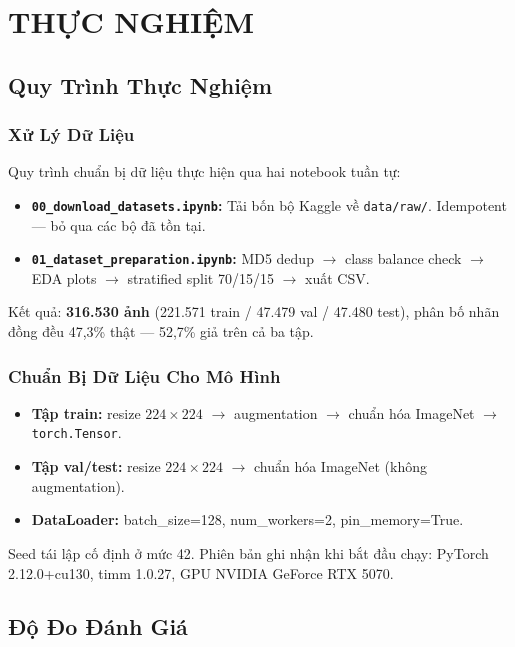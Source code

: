 \chapter{THỰC NGHIỆM}

\section{Quy Trình Thực Nghiệm}

\subsection{Xử Lý Dữ Liệu}

Quy trình chuẩn bị dữ liệu thực hiện qua hai notebook tuần tự:
\begin{itemize}
  \item \textbf{\texttt{00\_download\_datasets.ipynb}:} Tải bốn bộ Kaggle về \texttt{data/raw/}. Idempotent --- bỏ qua các bộ đã tồn tại.
  \item \textbf{\texttt{01\_dataset\_preparation.ipynb}:} MD5 dedup $\to$ class balance check $\to$ EDA plots $\to$ stratified split 70/15/15 $\to$ xuất CSV.
\end{itemize}

Kết quả: \textbf{316.530 ảnh} (221.571 train / 47.479 val / 47.480 test), phân bố nhãn đồng đều 47,3\% thật --- 52,7\% giả trên cả ba tập.

\subsection{Chuẩn Bị Dữ Liệu Cho Mô Hình}

\begin{itemize}
  \item \textbf{Tập train:} resize $224{\times}224$ $\to$ augmentation $\to$ chuẩn hóa ImageNet $\to$ \texttt{torch.Tensor}.
  \item \textbf{Tập val/test:} resize $224{\times}224$ $\to$ chuẩn hóa ImageNet (không augmentation).
  \item \textbf{DataLoader:} batch\_size=128, num\_workers=2, pin\_memory=True.
\end{itemize}

Seed tái lập cố định ở mức 42. Phiên bản ghi nhận khi bắt đầu chạy: PyTorch 2.12.0+cu130, timm 1.0.27, GPU NVIDIA GeForce RTX 5070.

\section{Độ Đo Đánh Giá}

